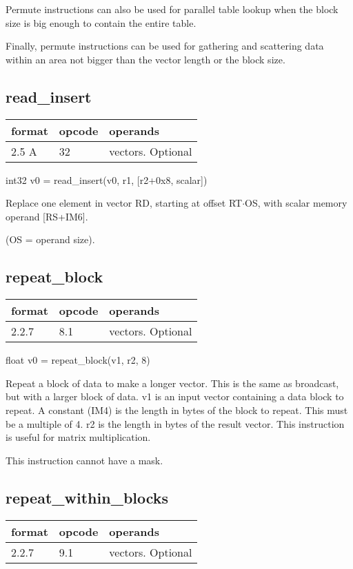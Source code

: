 \documentclass[forwardcom.tex]{subfiles}
\begin{document}
Permute instructions can also be used for parallel table lookup when the block size is big enough to contain the entire table.
\vv

Finally, permute instructions can be used for gathering and scattering data within an area not bigger than the vector length or the block size.
\vv

\subsection{read\_insert}
\label{table:readInsertInstruction}
\begin{tabular}{|p{12mm}|p{15mm}|p{100mm}|}
\hline
\bfseries format & \bfseries opcode & \bfseries operands \\ \hline
2.5 A & 32 & vectors. Optional \\ \hline
\end{tabular}
\vv

int32 v0 = read\_insert(v0, r1, [r2+0x8, scalar])
\vv

Replace one element in vector RD, starting
at offset RT$\cdot$OS, with scalar memory operand
[RS+IM6].

(OS = operand size).

\subsection{repeat\_block}
\label{table:repeatBlockInstruction}
\begin{tabular}{|p{12mm}|p{15mm}|p{100mm}|}
\hline
\bfseries format & \bfseries opcode & \bfseries operands \\ \hline
2.2.7 & 8.1 & vectors. Optional \\ \hline
\end{tabular}
\vv

float v0 = repeat\_block(v1, r2, 8) 
\vv

Repeat a block of data to make a longer vector. This is the same as broadcast, but with a larger block of data. v1 is an input vector containing a data block to repeat. A constant (IM4) is the length in bytes of the block to repeat. This must be a multiple of 4. r2 is the length in bytes of the result vector. This instruction is useful for matrix multiplication.
\vv

This instruction cannot have a mask.
\vv

\subsection{repeat\_within\_blocks}
\label{table:repeatWithinBlockInstruction}
\begin{tabular}{|p{12mm}|p{15mm}|p{100mm}|}
\hline
\bfseries format & \bfseries opcode & \bfseries operands \\ \hline
2.2.7 & 9.1 & vectors. Optional \\ \hline
\end{tabular}
\vv
\end{document}
